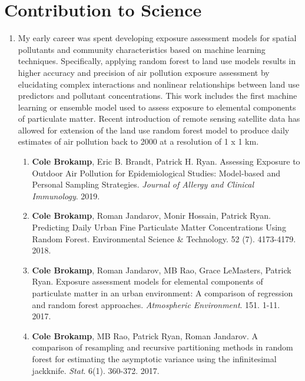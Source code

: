 \documentclass{nihbiosketch}
\begin{document}

\section{Contribution to Science}

\begin{enumerate}

\item My early career was spent developing exposure assessment models for
  spatial pollutants and community characteristics based on machine learning
  techniques.  Specifically, applying random forest to land use models results
  in higher accuracy and precision of air pollution exposure assessment by
  elucidating complex interactions and nonlinear relationships between land use
  predictors and pollutant concentrations. This work includes the first machine
  learning or ensemble model used to assess exposure to elemental components of
  particulate matter. Recent introduction of remote sensing satellite data has
  allowed for extension of the land use random forest model to produce daily
  estimates of air pollution back to 2000 at a resolution of 1 x 1 km.

\begin{enumerate}
	
  \item \textbf{Cole Brokamp}, Eric B. Brandt, Patrick H. Ryan. Assessing
  Exposure to Outdoor Air Pollution for Epidemiological Studies:
  Model-based and Personal Sampling Strategies. \emph{Journal of Allergy
    and Clinical Immunology}. 2019.

	\item \textbf{Cole Brokamp}, Roman Jandarov, Monir Hossain, Patrick Ryan. Predicting Daily Urban Fine Particulate Matter Concentrations Using Random Forest. Environmental Science \& Technology. 52 (7). 4173-4179. 2018.

	\item \textbf{Cole Brokamp}, Roman Jandarov, MB Rao, Grace LeMasters, Patrick Ryan. Exposure assessment models for elemental components of particulate matter in an urban environment: A comparison of regression and random forest approaches. \textit{Atmospheric Environment}. 151. 1-11. 2017.
	
	\item \textbf{Cole Brokamp}, MB Rao, Patrick Ryan, Roman Jandarov. A comparison of resampling and recursive partitioning methods in random forest for estimating the asymptotic variance using the infinitesimal jackknife. \textit{Stat}. 6(1). 360-372. 2017.


\end{enumerate}
\end{enumerate}
\end{document}
